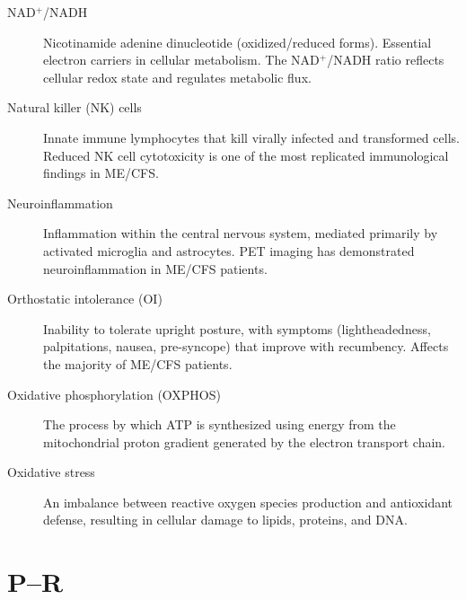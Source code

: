 \begin{description}
\item[NAD$^+$/NADH] Nicotinamide adenine dinucleotide (oxidized/reduced forms). Essential electron carriers in cellular metabolism. The NAD$^+$/NADH ratio reflects cellular redox state and regulates metabolic flux.
\item[Natural killer (NK) cells] Innate immune lymphocytes that kill virally infected and transformed cells. Reduced NK cell cytotoxicity is one of the most replicated immunological findings in ME/CFS.
\item[Neuroinflammation] Inflammation within the central nervous system, mediated primarily by activated microglia and astrocytes. PET imaging has demonstrated neuroinflammation in ME/CFS patients.
\item[Orthostatic intolerance (OI)] Inability to tolerate upright posture, with symptoms (lightheadedness, palpitations, nausea, pre-syncope) that improve with recumbency. Affects the majority of ME/CFS patients.
\item[Oxidative phosphorylation (OXPHOS)] The process by which ATP is synthesized using energy from the mitochondrial proton gradient generated by the electron transport chain.
\item[Oxidative stress] An imbalance between reactive oxygen species production and antioxidant defense, resulting in cellular damage to lipids, proteins, and DNA.
\end{description}

\section*{P--R}

